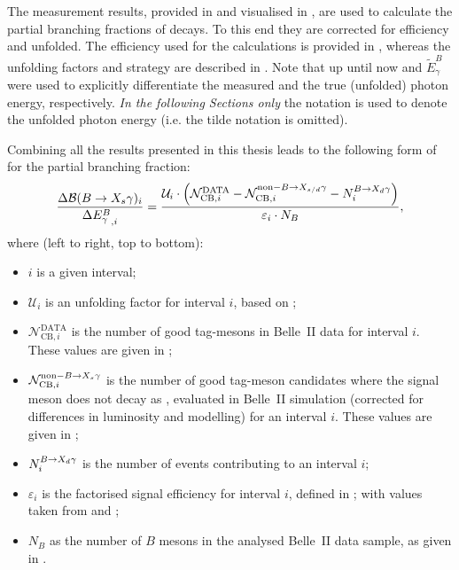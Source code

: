 The measurement results, provided in  and visualised in ,
are used to calculate the partial branching fractions of \BtoXsgamma decays.
To this end they are corrected for efficiency and unfolded.
The efficiency used for the calculations is provided in , 
whereas the unfolding factors and strategy are described in .
Note that up until now \EB and $\tilde{E}_{\gamma}^B$ were used to explicitly differentiate
the measured and the true (unfolded) photon energy, respectively.
\textit{In the following Sections only} the \EB notation is used to denote the unfolded photon energy (i.e. the tilde notation is omitted).

Combining all the results presented in this thesis leads to the following form of  for the partial branching fraction:
\begin{equation}\label{eq:branching_fraction}
    \frac{\Delta\mathcal{B}(\BtoXsgamma)_i}{\Delta {E^B_{\g}}_{,i}} = \frac{\mathcal{U}_i\cdot\left(\mathcal{N}^{\mathrm{DATA}}_{\mathrm{CB},i} - 
                                                                              \mathcal{N}^{\mathrm{non-}\BtoXsdgamma}_{\mathrm{CB},i} - 
                                                                              N_i^{\BtoXdgamma}\right)}
                                                         {\varepsilon_i \cdot N_B},
\end{equation}
where (left to right, top to bottom):
\begin{itemize}
    \item $i$ is a given \EB interval;
    \item $\mathcal{U}_i$ is an unfolding factor for interval $i$, based on ;
    \item $\mathcal{N}^{\mathrm{DATA}}_{\mathrm{CB},i}$ is the number of good tag-\B mesons in Belle~II data for interval $i$.
    These values are given in ;
    \item $\mathcal{N}^{\mathrm{non-}\BtoXsgamma}_{\mathrm{CB},i}$ is the number of good tag-\B meson candidates where the signal \B meson does not decay as \BtoXsdgamma, evaluated in Belle~II simulation (corrected for differences in luminosity and modelling) for an interval $i$.
    These values are given in ;
    \item $N_i^{\BtoXdgamma}$ is the number of \BtoXdgamma events contributing to an interval $i$;
    \item $\varepsilon_i$ is the factorised signal efficiency for interval $i$, defined in ; 
    with values taken from  and ;
    \item $N_B$ as the number of $B$ mesons in the analysed Belle~II data sample, as given in .
\end{itemize}

